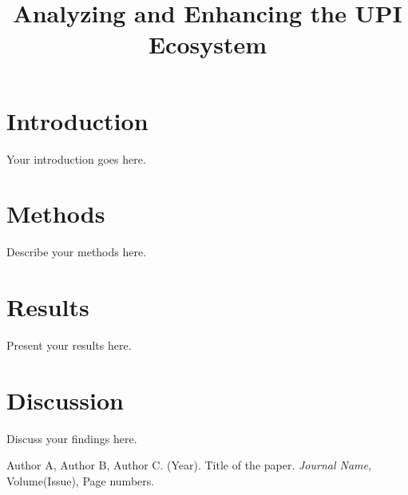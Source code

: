 \documentclass{article}
\title{Analyzing and Enhancing the UPI Ecosystem}
\begin{document}
\maketitle

\section{Introduction}
Your introduction goes here.

\section{Methods}
Describe your methods here.

\section{Results}
Present your results here.

\section{Discussion}
Discuss your findings here.

\begin{thebibliography}{9}
Author A, Author B, Author C. (Year). Title of the paper. \textit{Journal Name}, Volume(Issue), Page numbers.
\end{thebibliography}
\end{document}
